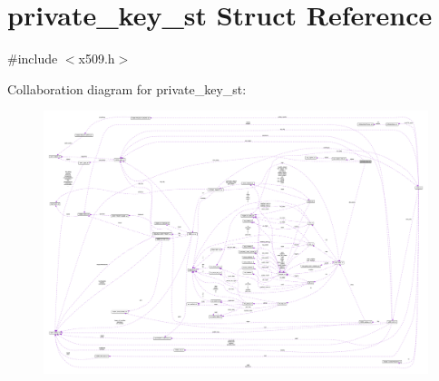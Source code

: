 \hypertarget{structprivate__key__st}{}\section{private\+\_\+key\+\_\+st Struct Reference}
\label{structprivate__key__st}


{\ttfamily \#include $<$x509.\+h$>$}



Collaboration diagram for private\+\_\+key\+\_\+st\+:\nopagebreak
\begin{figure}[H]
\begin{center}
\leavevmode
\includegraphics[width=350pt]{structprivate__key__st__coll__graph}
\end{center}
\end{figure}
